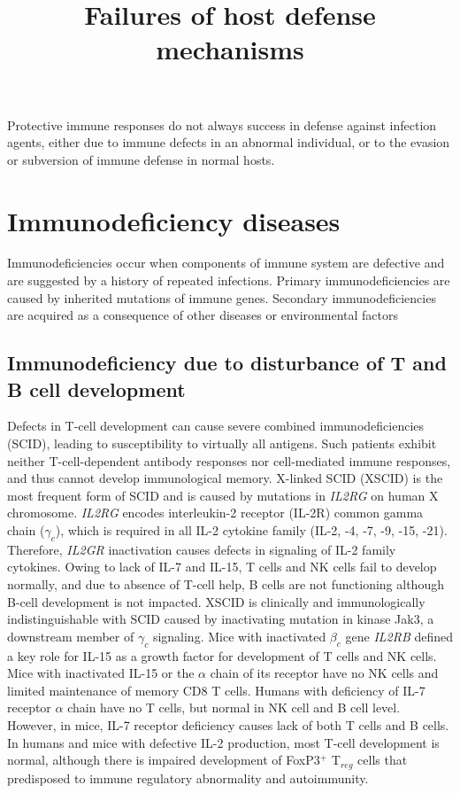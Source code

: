\documentclass[11pt]{article}
\title{Failures of host defense mechanisms}
\author{}
\date{}
\begin{document}
\begin{sloppypar}
  \maketitle

  \linenumbers
Protective immune responses do not always success in defense against infection agents, either due to immune defects in an abnormal individual, or to the evasion or subversion of immune defense in normal hosts. 

\section{Immunodeficiency diseases}
Immunodeficiencies occur when components of immune system are defective and are suggested by a history of repeated infections. 
Primary immunodeficiencies are caused by inherited mutations of immune genes. 
Secondary immunodeficiencies are acquired as a consequence of other diseases or environmental factors

\subsection{Immunodeficiency due to disturbance of T and B cell development}
Defects in T-cell development can cause severe combined immunodeficiencies (SCID), leading to susceptibility to virtually all antigens. 
Such patients exhibit neither T-cell-dependent antibody responses nor cell-mediated immune responses, and thus cannot develop immunological memory. 
X-linked SCID (XSCID) is the most frequent form of SCID and is caused by mutations in \textit{IL2RG} on human X chromosome. 
\textit{IL2RG} encodes interleukin-2 receptor (IL-2R) common gamma chain ($\gamma_c$), which is required in all IL-2 cytokine family (IL-2, -4, -7, -9, -15, -21). 
Therefore, \textit{IL2GR} inactivation causes defects in signaling of IL-2 family cytokines. 
Owing to lack of IL-7 and IL-15, T cells and NK cells fail to develop normally, and due to absence of T-cell help, B cells are not functioning although B-cell development is not impacted. 
XSCID is clinically and immunologically indistinguishable with SCID caused by inactivating mutation in kinase Jak3, a downstream member of $\gamma_c$ signaling. 
Mice with inactivated $\beta_c$ gene \textit{IL2RB} defined a key role for IL-15 as a growth factor for development of T cells and NK cells. 
Mice with inactivated IL-15 or the $\alpha$ chain of its receptor have no NK cells and limited maintenance of memory CD8 T cells. 
Humans with deficiency of IL-7 receptor $\alpha$ chain have no T cells, but normal in NK cell and B cell level. 
However, in mice, IL-7 receptor deficiency causes lack of both T cells and B cells. 
In humans and mice with defective IL-2 production, most T-cell development is normal, although there is impaired development of FoxP3$^+$ T$_{reg}$ cells that predisposed to immune regulatory abnormality and autoimmunity. 


\end{sloppypar}
\end{document}
